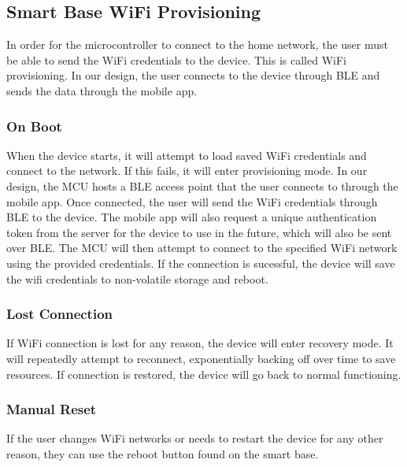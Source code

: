 \subsection{Smart Base WiFi Provisioning}

In order for the microcontroller to connect to the home network, the user must be able to send the WiFi credentials to the device. This is called WiFi provisioning. In our design, the user connects to the device through BLE and sends the data through the mobile app.

\subsubsection{On Boot}
When the device starts, it will attempt to load saved WiFi credentials and connect to the network. If this fails, it will enter provisioning mode. In our design, the MCU hosts a BLE access point that the user connects to through the mobile app. Once connected, the user will send the WiFi credentials through BLE to the device. The mobile app will also request a unique authentication token from the server for the device to use in the future, which will also be sent over BLE. The MCU will then attempt to connect to the specified WiFi network using the provided credentials. If the connection is sucessful, the device will save the wifi credentials to non-volatile storage and reboot.

\subsubsection{Lost Connection}
If WiFi connection is lost for any reason, the device will enter recovery mode. It will repeatedly attempt to reconnect, exponentially backing off over time to save resources. If connection is restored, the device will go back to normal functioning.

\subsubsection{Manual Reset}
If the user changes WiFi networks or needs to restart the device for any other reason, they can use the reboot button found on the smart base.